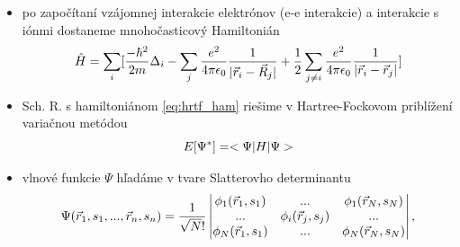 \documentclass[
	11pt, %
]{beamer}
\begin{document}
\begin{frame}

\begin{itemize}
\item po započítaní vzájomnej interakcie elektrónov (e-e interakcie) a interakcie s iónmi dostaneme mnohočasticový Hamiltonián
\begin{equation}
\label{eq:hrtf_ham}
\hat{H}=\sum_i [ \frac{-\hbar^2}{2m}\Delta_i  -\sum_j\frac{e^2}{4\pi \epsilon_0}{\frac{1}{|\vec{r}_i-\vec{R}_j|}} +\frac{1}{2}\sum_{j\neq i}\frac{e^2}{4\pi\epsilon_0}\frac{1}{|\vec{r}_i-\vec{r}_j|} ]
\end{equation}
\item Sch. R. s hamiltoniánom \eqref{eq:hrtf_ham} riešime v Hartree-Fockovom priblížení variačnou metódou
\begin{equation}
\label{eq:erg_func}
E[\Psi^*]=<\Psi|H|\Psi>
\end{equation}
\item vlnové funkcie $\Psi$ hľadáme v tvare Slatterovho determinantu 
\begin{equation}
\label{eq:slatter}
\Psi(\vec{r}_1,s_1,...,\vec{r}_n,s_n)=\frac{1}{\sqrt N!}
\begin{vmatrix}
\phi_1(\vec{r}_1,s_1)& ... & \phi_1(\vec{r}_N,s_N) \\
...& \phi_i(\vec{r}_j,s_j)& ... \\
\phi_N(\vec{r}_1,s_1)& ... & \phi_N(\vec{r}_N,s_N)
\end{vmatrix}
\text{,}
\end{equation}
\end{itemize}
\end{frame}
\end{document}
